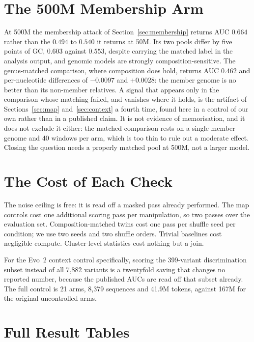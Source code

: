 \documentclass[11pt]{article}
\begin{document}
\section{The 500M Membership Arm}
\label{sec:mem500}

At 500M the membership attack of Section~\ref{sec:membership} returns AUC $0.664$
rather than the $0.494$ to $0.540$ it returns at 50M. Its two pools differ by five
points of GC, $0.603$ against $0.553$, despite carrying the matched label in the
analysis output, and genomic models are strongly composition-sensitive. The
genus-matched comparison, where composition does hold, returns AUC $0.462$ and
per-nucleotide differences of $-0.0097$ and $+0.0028$: the member genome is no
better than its non-member relatives. A signal that appears only in the comparison
whose matching failed, and vanishes where it holds, is the artifact of
Sections~\ref{sec:map} and~\ref{sec:context} a fourth time, found here in a control
of our own rather than in a published claim. It is not evidence of memorisation,
and it does not exclude it either: the matched comparison rests on a single member
genome and 40 windows per arm, which is too thin to rule out a moderate effect.
Closing the question needs a properly matched pool at 500M, not a larger model.

\section{The Cost of Each Check}
\label{sec:costdetail}

The noise ceiling is free: it is read off a masked pass already performed. The map
controls cost one additional scoring pass per manipulation, so two passes over the
evaluation set. Composition-matched twins cost one pass per shuffle seed per
condition; we use two seeds and two shuffle orders. Trivial baselines cost
negligible compute. Cluster-level statistics cost nothing but a join.

For the Evo~2 context control specifically, scoring the 399-variant discrimination
subset instead of all 7{,}882 variants is a twentyfold saving that changes no
reported number, because the published AUCs are read off that subset already. The
full control is 21 arms, 8{,}379 sequences and 41.9M tokens, against 167M for the
original uncontrolled arms.

\section{Full Result Tables}
\label{app:tables}
\end{document}

